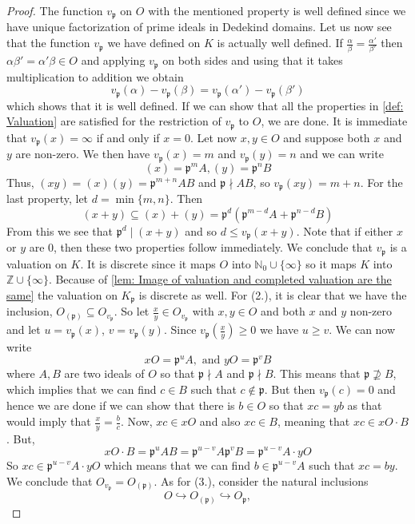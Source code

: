 \documentclass{article}
\newcommand{\mfrak}[1]{\mathfrak{#1}}
\newcommand{\mbb}[1]{\mathbb{#1}}
\newcommand{\vp}{{v_{\mfrak p}}}
\begin{document}
\begin{proof}
    The function $\vp$ on $O$ with the mentioned property is well defined since we have unique factorization of prime ideals in Dedekind domains. Let us now see that the function $\vp$ we have defined on $K$ is actually well defined. If $\frac{\alpha}{\beta} = \frac{\alpha'}{\beta'}$ then $\alpha\beta' = \alpha'\beta \in O$ and applying $\vp$ on both sides and using that it takes multiplication to addition we obtain
    $$\vp(\alpha) - \vp(\beta) = \vp(\alpha') - \vp(\beta')$$
    which shows that it is well defined. If we can show that all the properties in \cref{def: Valuation} are satisfied for the restriction of $\vp$ to $O$, we are done. It is immediate that $\vp(x) = \infty$ if and only if $x = 0$. Let now $x,y \in O$ and suppose both $x$ and $y$ are non-zero. We then have $\vp (x) = m$ and $\vp (y) = n$ and we can write
    $$(x) = \mfrak{p}^m A, (y) = \mfrak{p}^n B$$
    Thus, $(xy) = (x)(y) = \mfrak{p}^{m+n} AB$ and $\mfrak p \nmid AB$, so $\vp(xy) = m + n$. For the last property, let $d = \min\{m, n\}$. Then
    $$(x + y) \subseteq (x) + (y) = \mfrak p^d (\mfrak p^{m-d} A + \mfrak p^{n-d} B)$$
    From this we see that $\mfrak p^d \mid (x + y)$ and so $d \leq \vp (x+y)$. 
    Note that if either $x$ or $y$ are 0, then these two properties follow immediately. We conclude that $\vp$ is a valuation on $K$. It is discrete since it maps $O$ into $\mbb N_0 \cup \{\infty \}$ so it maps $K$ into $\mbb Z \cup \{\infty \}$. Because of \cref{lem: Image of valuation and completed valuation are the same} the valuation on $K_\mfrak p$ is discrete as well. For (2.), it is clear that we have the inclusion, $O_{(\mfrak p)} \subseteq O_\vp$. So let $\frac{x}{y} \in O_\vp$ with $x,y \in O$ and both $x$ and $y$ non-zero and let $u = \vp(x)$, $v = \vp(y)$. Since $\vp(\frac{x}{y})  \geq 0$ we have $u \geq v$. We can now write 
    $$x O = \mfrak p^u A, \text{ and } y O = \mfrak p^v B$$
    where $A,B$ are two ideals of $O$ so that $\mfrak p \nmid A$ and $\mfrak p \nmid B$. This means that $\mfrak p \nsupseteq B$, which implies that we can find $c \in B$ such that $c \notin \mfrak p$. But then $\vp(c) = 0$ and hence we are done if we can show that there is $b \in O$ so that $xc = yb$ as that would imply that $\frac{x}{y} = \frac{b}{c}$. Now, $xc \in x O$ and also $xc \in B$, meaning that $xc \in x O \cdot B$. But,
    $$x O \cdot B = \mfrak p^u A B = \mfrak p^{u-v} A \mfrak p^v B = \mfrak p^{u-v} A \cdot y O$$   
    So $xc \in \mfrak p^{u-v} A \cdot y O$ which means that we can find $b \in \mfrak p^{u-v} A$ such that $xc = by$. We conclude that $O_\vp = O_{(\mfrak p)}$.  
    As for (3.), consider the natural inclusions 
    $$O \hookrightarrow O_{(\mfrak p)} \hookrightarrow O_\mfrak p,$$
    

\end{proof}
\end{document}
